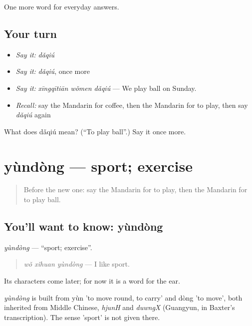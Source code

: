 \begin{grammarlens}[title={What you've built}]
One more word for everyday answers.
\end{grammarlens}

\subsection*{Your turn}
\begin{itemize}
\raggedright
  \item \emph{Say it:} \emph{dǎqiú}
  \item \emph{Say it:} \emph{dǎqiú}, once more
  \item \emph{Say it:} \emph{xīngqītiān wǒmen dǎqiú} — We play ball on Sunday.
  \item \emph{Recall:} say the Mandarin for coffee, then the Mandarin for to play, then say \emph{dǎqiú} again
\end{itemize}

\begin{tcolorbox}[breakable,colback=teal!4,colframe=teal!35!black,title={Before you move on}]
What does dǎqiú mean? (\textquotedblleft{}To play ball\textquotedblright{}.) Say it once more.
\end{tcolorbox}
\section[yùndòng]{yùndòng — sport; exercise}

\label{lesson:ZH-C56-yundong}



\begin{quote}
Before the new one: say the Mandarin for to play, then the Mandarin for to play ball.
\end{quote}

\subsection*{You'll want to know: yùndòng}
\emph{yùndòng} — \textquotedblleft{}sport; exercise\textquotedblright{}.

\begin{quote}
\emph{wǒ xǐhuan yùndòng} — I like sport.
\end{quote}

Its characters come later; for now it is a word for the ear.

\begin{cousinweb}
\emph{yùndòng} is built from yùn 'to move round, to carry' and dòng 'to move', both inherited from Middle Chinese, \emph{hjunH} and \emph{duwngX} (Guangyun, in Baxter's transcription). The sense 'sport' is not given there.
\end{cousinweb}


